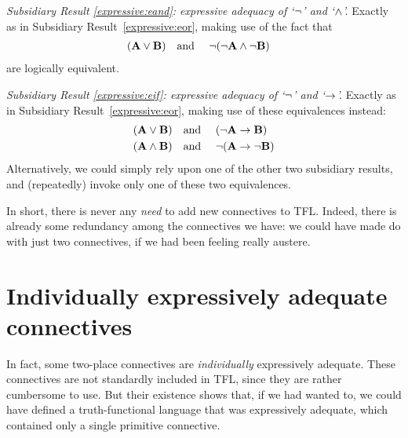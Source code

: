 \emph{Subsidiary Result \ref{expressive:eand}: expressive adequacy of `$\neg$' and `$\wedge$'.} Exactly as in Subsidiary Result~\ref{expressive:eor}, making use of the fact that
		\begin{align*}
		(\mathbf{A} \vee \mathbf{B}) & \text{\quad and \quad}\neg(\neg \mathbf{A} \wedge\neg \mathbf{B})
		\end{align*}
are logically equivalent.

\emph{Subsidiary Result \ref{expressive:eif}: expressive adequacy of `$\neg$' and `$\rightarrow$'.} Exactly as in Subsidiary Result~\ref{expressive:eor}, making use of these equivalences instead:
		\begin{align*}
		(\mathbf{A} \vee \mathbf{B}) &\text{\quad and \quad} (\neg \mathbf{A} \rightarrow \mathbf{B})\\
		(\mathbf{A} \wedge \mathbf{B}) &\text{\quad and \quad} \neg(\mathbf{A} \rightarrow \neg\mathbf{B})
		\end{align*}
Alternatively, we could simply rely upon one of the other two subsidiary results, and (repeatedly) invoke only one of these two equivalences.

In short, there is never any \emph{need} to add new connectives to TFL. Indeed, there is already some redundancy among the connectives we have: we could have made do with just two connectives, if we had been feeling really austere.

\section{Individually expressively adequate connectives}

In fact, some two-place connectives are \emph{individually} expressively adequate. These connectives are not standardly included in TFL, since they are rather cumbersome to use. But their existence shows that, if we had wanted to, we could have defined a truth-functional language that was expressively adequate, which contained only a single primitive connective.


